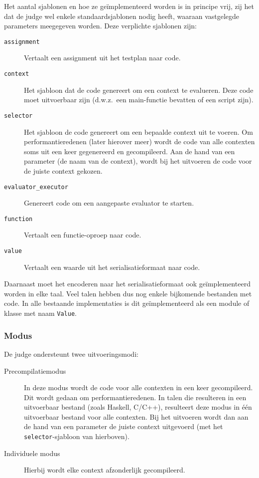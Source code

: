 Het aantal sjablonen en hoe ze geïmplementeerd worden is in principe vrij, zij het dat de judge wel enkele standaardsjablonen nodig heeft, waaraan vastgelegde parameters meegegeven worden.
Deze verplichte sjablonen zijn:
\begin{description}
    \item[\texttt{assignment}] Vertaalt een assignment uit het testplan naar code.
    \item[\texttt{context}] Het sjabloon dat de code genereert om een context te evalueren.
    Deze code moet uitvoerbaar zijn (d.w.z.\ een main-functie bevatten of een script zijn).
    \item[\texttt{selector}] Het sjabloon de code genereert om een bepaalde context uit te voeren.
    Om performantieredenen (later hierover meer) wordt de code van alle contexten soms uit een keer gegenereerd en gecompileerd.
    Aan de hand van een parameter (de naam van de context), wordt bij het uitvoeren de code voor de juiste context gekozen.
    \item[\texttt{evaluator\_executor}] Genereert code om een aangepaste evaluator te starten.
    \item[\texttt{function}] Vertaalt een functie-oproep naar code.
    \item[\texttt{value}] Vertaalt een waarde uit het serialisatieformaat naar code.
\end{description}

Daarnaast moet het encoderen naar het serialisatieformaat ook geïmplementeerd worden in elke taal.
Veel talen hebben dus nog enkele bijkomende bestanden met code.
In alle bestaande implementaties is dit geïmplementeerd als een module of klasse met naam \texttt{Value}.

\subsubsection{Modus}\label{sss:modus}

De judge ondersteunt twee uitvoeringsmodi:
\begin{description}
    \item[Precompilatiemodus] In deze modus wordt de code voor alle contexten in een keer gecompileerd.
    Dit wordt gedaan om performantieredenen.
    In talen die resulteren in een uitvoerbaar bestand (zoals Haskell, C/C++), resulteert deze modus in één uitvoerbaar bestand voor alle contexten.
    Bij het uitvoeren wordt dan aan de hand van een parameter de juiste context uitgevoerd (met het \texttt{selector}-sjabloon van hierboven).
    \item[Individuele modus] Hierbij wordt elke context afzonderlijk gecompileerd.
\end{description}

